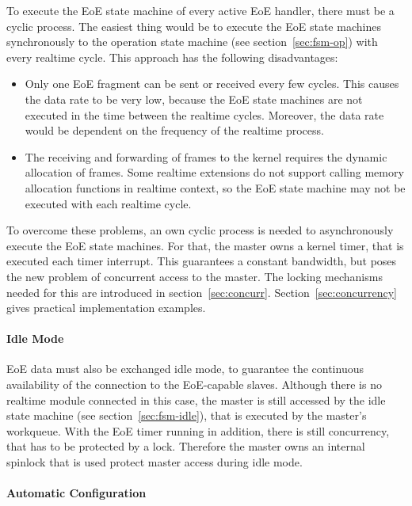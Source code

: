 \documentclass[a4paper,12pt,BCOR6mm,bibtotoc,idxtotoc]{scrbook}
\begin{document}
To execute the EoE state machine of every active EoE handler, there
must be a cyclic process. The easiest thing would be to execute the
EoE state machines synchronously to the operation state machine (see
section~\ref{sec:fsm-op}) with every realtime cycle. This approach has
the following disadvantages:

\begin{itemize}
\item Only one EoE fragment can be sent or received every few cycles.
  This causes the data rate to be very low, because the EoE state
  machines are not executed in the time between the realtime
  cycles. Moreover, the data rate would be dependent on the frequency
  of the realtime process.
\item The receiving and forwarding of frames to the kernel requires
  the dynamic allocation of frames. Some realtime extensions do not
  support calling memory allocation functions in realtime context, so
  the EoE state machine may not be executed with each realtime cycle.
\end{itemize}

To overcome these problems, an own cyclic process is needed to
asynchronously execute the EoE state machines. For that, the master
owns a kernel timer, that is executed each timer interrupt. This
guarantees a constant bandwidth, but poses the new problem of
concurrent access to the master. The locking mechanisms needed for
this are introduced in section~\ref{sec:concurr}.
Section~\ref{sec:concurrency} gives practical implementation examples.

\paragraph{Idle Mode}

EoE data must also be exchanged idle mode, to guarantee the continuous
availability of the connection to the EoE-capable slaves. Although
there is no realtime module connected in this case, the master is
still accessed by the idle state machine (see
section~\ref{sec:fsm-idle}), that is executed by the master's
workqueue. With the EoE timer running in addition, there is still
concurrency, that has to be protected by a lock. Therefore the master
owns an internal spinlock that is used protect master access during
idle mode.

\paragraph{Automatic Configuration}
\end{document}
